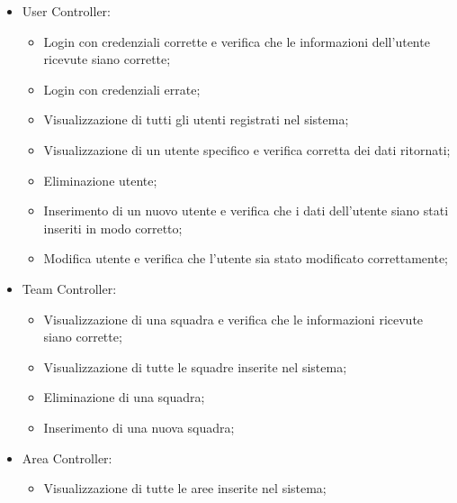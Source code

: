 \begin{itemize}
	\item User Controller:
	\begin{itemize}
		\item Login con credenziali corrette e verifica che le informazioni dell'utente ricevute siano corrette;
		\item Login con credenziali errate;
		\item Visualizzazione di tutti gli utenti registrati nel sistema;
		\item Visualizzazione di un utente specifico e verifica corretta dei dati ritornati;
		\item Eliminazione utente;
		\item Inserimento di un nuovo utente e verifica che i dati dell'utente siano stati inseriti in modo corretto;
		\item Modifica utente e verifica che l'utente sia stato modificato correttamente;
	\end{itemize}
	\item Team Controller:
	\begin{itemize}
		\item Visualizzazione di una squadra e verifica che le informazioni ricevute siano corrette;
		\item Visualizzazione di tutte le squadre inserite nel sistema;
		\item Eliminazione di una squadra;
		\item Inserimento di una nuova squadra;
	\end{itemize}
	\item Area Controller:
	\begin{itemize}
		\item Visualizzazione di tutte le aree inserite nel sistema;
	\end{itemize}


\end{itemize}
